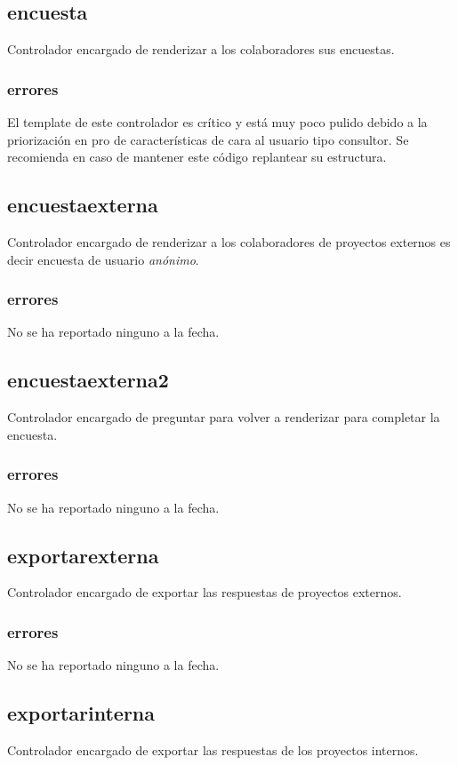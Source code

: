 \documentclass[10pt,a4paper]{book}
\begin{document}
	\subsection{encuesta}
	Controlador encargado de renderizar a los colaboradores sus encuestas.
	\subsubsection{errores}
	El template de este controlador es crítico y está muy poco pulido debido a la priorización en pro de características de cara al usuario tipo consultor. Se recomienda en caso de mantener este código replantear su estructura.
	
	\subsection{encuestaexterna}
	Controlador encargado de renderizar a los colaboradores de proyectos externos es decir encuesta de usuario \textit{anónimo}.
	\subsubsection{errores}
	No se ha reportado ninguno a la fecha.
	
	\subsection{encuestaexterna2}
	Controlador encargado de preguntar para volver a renderizar para completar la encuesta.
	\subsubsection{errores}
	No se ha reportado ninguno a la fecha.
	
	\subsection{exportarexterna}
	Controlador encargado de exportar las respuestas de proyectos externos.
	\subsubsection{errores}
	No se ha reportado ninguno a la fecha.
	
	\subsection{exportarinterna}
	Controlador encargado de exportar las respuestas de los proyectos internos.
\end{document}

